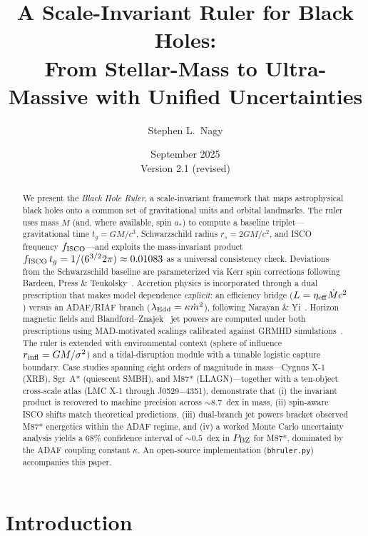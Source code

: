 \documentclass[11pt]{article}
\title{A Scale-Invariant Ruler for Black Holes:\\From Stellar-Mass to Ultra-Massive with Unified Uncertainties}
\author{Stephen L.\ Nagy}
\affil{Independent Researcher}
\date{September 2025 \\ \small Version 2.1 (revised)}
\begin{document}
\maketitle

\begin{abstract}
We present the \emph{Black Hole Ruler}, a scale-invariant framework that maps astrophysical black holes onto a common set of gravitational units and orbital landmarks.
The ruler uses mass $M$ (and, where available, spin $a_*$) to compute a baseline triplet---gravitational time $t_g=GM/c^3$, Schwarzschild radius $r_s=2GM/c^2$, and ISCO frequency $f_{\rm ISCO}$---and exploits the mass-invariant product $f_{\rm ISCO}\,t_g = 1/(6^{3/2}2\pi) \approx 0.01083$ as a universal consistency check.
Deviations from the Schwarzschild baseline are parameterized via Kerr spin corrections following Bardeen, Press \& Teukolsky~\cite{BardeenPressTeukolsky1972}.
Accretion physics is incorporated through a dual prescription that makes model dependence \emph{explicit}: an efficiency bridge ($L=\eta_{\rm eff}\dot{M}c^2$) versus an ADAF/RIAF branch ($\lambda_{\rm Edd}=\kappa\dot{m}^2$), following Narayan \& Yi~\cite{NarayanYi1994}.
Horizon magnetic fields and Blandford--Znajek~\cite{BlandfordZnajek1977} jet powers are computed under both prescriptions using MAD-motivated scalings calibrated against GRMHD simulations~\cite{Tchekhovskoy2011,McKinney2012}.
The ruler is extended with environmental context (sphere of influence $r_{\rm infl}=GM/\sigma^2$) and a tidal-disruption module with a tunable logistic capture boundary.
Case studies spanning eight orders of magnitude in mass---Cygnus X-1 (XRB), Sgr~A* (quiescent SMBH), and M87* (LLAGN)---together with a ten-object cross-scale atlas (LMC X-1 through J0529$-$4351), demonstrate that (i) the invariant product is recovered to machine precision across $\sim 8.7$~dex in mass, (ii) spin-aware ISCO shifts match theoretical predictions, (iii) dual-branch jet powers bracket observed M87* energetics within the ADAF regime, and (iv) a worked Monte Carlo uncertainty analysis yields a 68\% confidence interval of $\sim 0.5$~dex in $P_{\rm BZ}$ for M87*, dominated by the ADAF coupling constant $\kappa$.
An open-source implementation (\texttt{bhruler.py}) accompanies this paper.
\end{abstract}

\section{Introduction}\label{sec:intro}
\end{document}

